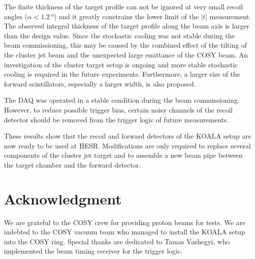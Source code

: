 \documentclass[number,5p]{elsarticle}
\begin{document}
The finite thickness of the target profile can not be ignored at
very small recoil angles ($\alpha < \SI{1.2}{\degree}$) and it greatly
constrains the lower limit of the $|t|$ measurement.
The observed integral thickness of the target profile along the beam axis is larger than the design value.
Since the stochastic cooling was not stable during the beam commissioning, this may be caused by the combined effect of the tilting of the cluster jet
beam and the unexpected large emittance of the COSY beam.
An investigation of the cluster target setup is ongoing and more stable stochastic cooling is required in the future experiments.
Furthermore, a larger size of the forward scintillators, especially a larger width, is also proposed.

The DAQ was operated in a stable condition during the beam commissioning.
However, to reduce possible trigger bias, certain noisy channels of the recoil
detector should be removed from the trigger logic of future measurements.


These results show that the recoil and forward detectors of the KOALA setup are now ready to be used at HESR.
Modifications are only required to replace several components of the cluster jet target and to assemble a new beam pipe between the target chamber and the forward detector.

\section{Acknowledgment}
\label{sec:acknowledgement}
We are grateful to the COSY crew for providing proton beams for tests.
We are indebted to the COSY vacuum team who managed to install the KOALA
setup into the COSY ring. Special thanks are dedicated to Tamas
Vashegyi, who implemented the beam timing receiver for the trigger logic.



\end{document}
